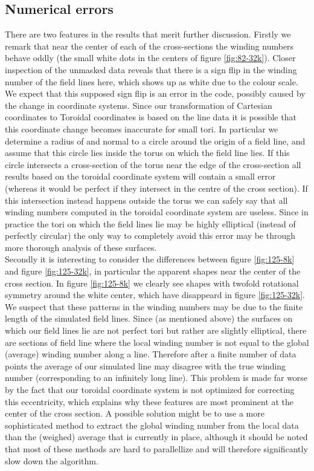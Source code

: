 \documentclass{article}
\begin{document}
\subsection{Numerical errors}
There are two features in the results that merit further discussion. Firstly we remark that near the center of each of the cross-sections the winding numbers behave oddly (the small white dots in the centers of figure \ref{fig:82-32k}). Closer inspection of the unmasked data reveals that there is a sign flip in the winding number of the field lines here, which shows up as white due to the colour scale. We expect that this supposed sign flip is an error in the code, possibly caused by the change in coordinate systems. Since our transformation of Cartesian coordinates to Toroidal coordinates is based on the line data it is possible that this coordinate change becomes inaccurate for small tori. In particular we determine a radius of and normal to a circle around the origin of a field line, and assume that this circle lies inside the torus on which the field line lies. If this circle intersects a cross-section of the torus near the edge of the cross-section all results based on the toroidal coordinate system will contain a small error (whereas it would be perfect if they intersect in the centre of the cross section). If this intersection instead happens outside the torus we can safely say that all winding numbers computed in the toroidal coordinate system are useless. Since in practice the tori on which the field lines lie may be highly elliptical (instead of perfectly circular) the only way to completely avoid this error may be through more thorough analysis of these surfaces.\\

Secondly it is interesting to consider the differences between figure \ref{fig:125-8k} and figure \ref{fig:125-32k}, in particular the apparent shapes near the center of the cross section. In figure \ref{fig:125-8k} we clearly see shapes with twofold rotational symmetry around the white center, which have disappeard in figure \ref{fig:125-32k}. We suspect that these patterns in the winding numbers may be due to the finite length of the simulated field lines. Since (as mentioned above) the surfaces on which our field lines lie are not perfect tori but rather are slightly elliptical, there are sections of field line where the local winding number is not equal to the global (average) winding number along a line. Therefore after a finite number of data points the average of our simulated line may disagree with the true winding number (corresponding to an infinitely long line). This problem is made far worse by the fact that our toroidal coordinate system is not optimized for correcting this eccentricity, which explains why these features are most prominent at the center of the cross section. A possible solution might be to use a more sophisticated method to extract the global winding number from the local data than the (weighed) average that is currently in place, although it should be noted that most of these methods are hard to parallellize and will therefore significantly slow down the algorithm.\\
\end{document}
